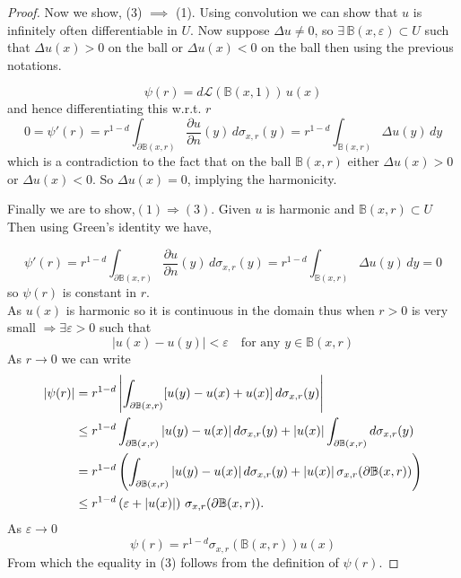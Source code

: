 \documentclass[11pt, a4paper, oneside]{report}
\numberwithin{equation}{section}
\begin{document}
\begin{proof}
\noindent Now we show, (3) \(\implies\) (1). Using convolution we can show that \( u \) is infinitely often differentiable in \( U \). Now suppose \( \Delta u \ne 0 \), so \( \exists \, \mathbb{B}(x, \varepsilon) \subset U \) such that \( \Delta u(x) > 0 \) on the ball or \( \Delta u(x) < 0 \) on the ball then 
using the previous notations.

\[
\psi(r) = d\mathscr{L}(\mathbb{B}(x,1)) \, u(x)
\]
and hence differentiating this w.r.t. \( r \)
\[
0 = \psi'(r) = r^{1-d} \int_{\partial \mathbb{B}(x,r)} \frac{\partial u}{\partial n}(y) \, d\sigma_{x,r}(y)
= r^{1-d} \int_{\mathbb{B}(x,r)} \Delta u(y) \, dy
\]
\noindent which is a contradiction to the fact that 
on the ball \( \mathbb{B}(x,r) \) either \( \Delta u(x) > 0 \) or 
\( \Delta u(x) < 0 \). So \( \Delta u(x) = 0 \), implying the harmonicity.

\noindent Finally we are to show,\(
(1) \Rightarrow (3)
\). 
\noindent  Given \( u \) is harmonic and \( \mathbb{B}(x, r) \subset U \) \\
Then using Green's identity we have,

\[
\psi'(r) = r^{1-d} \int_{\partial \mathbb{B}(x,r)} \frac{\partial u}{\partial n}(y) \, d\sigma_{x,r}(y) = r^{1-d} \int_{\mathbb{B}(x,r)} \Delta u(y) \, dy = 0
\]
\noindent so \( \psi(r) \) is constant in \( r \). \\
As \( u(x) \) is harmonic so it is continuous in the domain thus when \( r > 0 \) is very small \( \Rightarrow \exists \varepsilon >0 \) such that
\[
|u(x) - u(y)| < \varepsilon \quad \text{for any } y \in \mathbb{B}(x,r)
\]
As \(r \to 0\) we can write
\begin{align*}
|\psi(r)| 
&= r^{1-d} \left| \int_{\partial \mathbb{B}(x,r)} [u(y) - u(x) + u(x)] \, d\sigma_{x,r}(y) \right| \notag \\
&\leq r^{1-d} \int_{\partial \mathbb{B}(x,r)} |u(y) - u(x)| \, d\sigma_{x,r}(y) 
+ |u(x)| \int_{\partial \mathbb{B}(x,r)} d\sigma_{x,r}(y) \notag \\
&= r^{1-d} \left( \int_{\partial \mathbb{B}(x,r)} |u(y) - u(x)| \, d\sigma_{x,r}(y) 
+ |u(x)| \, \sigma_{x,r}(\partial \mathbb{B}(x,r)) \right) \notag \\
&\leq r^{1-d} \left( \varepsilon + |u(x)| \right) \, \sigma_{x,r}(\partial \mathbb{B}(x,r)).
\end{align*}
\noindent As \(\varepsilon \to 0\)
\[
\psi(r)= r^{1-d} \sigma_{x,r}(\mathbb{B}(x,r)) u(x)
\]
From which the equality in (3) follows from the definition of \(\psi(r)\).


\end{proof}
\end{document}
